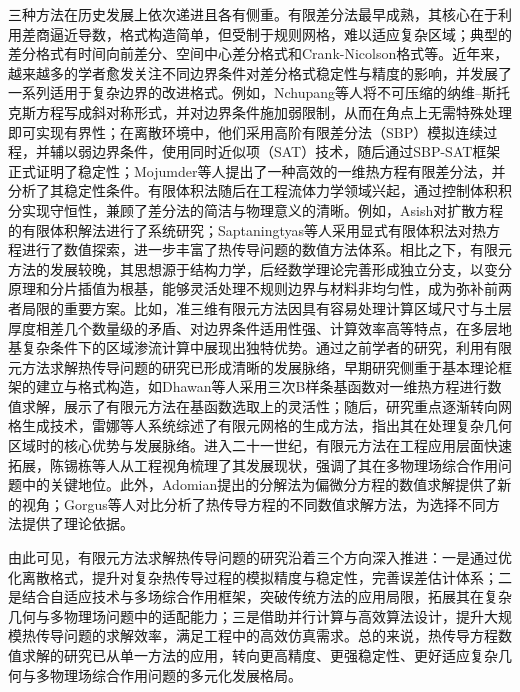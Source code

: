 \documentclass{GZUbachelorthesis}
\theoremstyle{chineseplain}
\begin{document}
三种方法在历史发展上依次递进且各有侧重。有限差分法最早成熟，其核心在于利用差商逼近导数，格式构造简单，但受制于规则网格，难以适应复杂区域；典型的差分格式有时间向前差分、空间中心差分格式和Crank-Nicolson格式等\cite{mojumder2023efficient}。近年来，越来越多的学者愈发关注不同边界条件对差分格式稳定性与精度的影响，并发展了一系列适用于复杂边界的改进格式。例如，Nchupang等人将不可压缩的纳维–斯托克斯方程写成斜对称形式，并对边界条件施加弱限制，从而在角点上无需特殊处理即可实现有界性；在离散环境中，他们采用高阶有限差分法（SBP）模拟连续过程，并辅以弱边界条件，使用同时近似项（SAT）技术，随后通过SBP-SAT框架正式证明了稳定性\cite{Nchupang2025}；Mojumder等人提出了一种高效的一维热方程有限差分法，并分析了其稳定性条件\cite{mojumder2023efficient}。有限体积法随后在工程流体力学领域兴起，通过控制体积积分实现守恒性，兼顾了差分法的简洁与物理意义的清晰。例如，Asish对扩散方程的有限体积解法进行了系统研究\cite{asish2016finite}；Saptaningtyas等人采用显式有限体积法对热方程进行了数值探索，进一步丰富了热传导问题的数值方法体系\cite{saptaningtyas2018finite}。相比之下，有限元方法的发展较晚，其思想源于结构力学，后经数学理论完善形成独立分支，以变分原理和分片插值为根基，能够灵活处理不规则边界与材料非均匀性，成为弥补前两者局限的重要方案\cite{lei2024review,chen2010finite}。比如，准三维有限元方法因具有容易处理计算区域尺寸与土层厚度相差几个数量级的矛盾、对边界条件适用性强、计算效率高等特点，在多层地基复杂条件下的区域渗流计算中展现出独特优势\cite{mei2023quasi3D}。通过之前学者的研究，利用有限元方法求解热传导问题的研究已形成清晰的发展脉络，早期研究侧重于基本理论框架的建立与格式构造，如Dhawan等人采用三次B样条基函数对一维热方程进行数值求解，展示了有限元方法在基函数选取上的灵活性\cite{dhawan2009numerical}；随后，研究重点逐渐转向网格生成技术，雷娜等人系统综述了有限元网格的生成方法，指出其在处理复杂几何区域时的核心优势与发展脉络\cite{lei2024review}。进入二十一世纪，有限元方法在工程应用层面快速拓展，陈锡栋等人从工程视角梳理了其发展现状，强调了其在多物理场综合作用问题中的关键地位\cite{chen2010finite}。此外，Adomian提出的分解法为偏微分方程的数值求解提供了新的视角\cite{adomian1994solution, adomian1998review}；Gorgus等人对比分析了热传导方程的不同数值求解方法，为选择不同方法提供了理论依据\cite{gorguis2008heat}。

由此可见，有限元方法求解热传导问题的研究沿着三个方向深入推进：一是通过优化离散格式，提升对复杂热传导过程的模拟精度与稳定性，完善误差估计体系\cite{adomian1994solution}；二是结合自适应技术与多场综合作用框架，突破传统方法的应用局限，拓展其在复杂几何与多物理场问题中的适配能力\cite{lei2024review,chen2010finite}；三是借助并行计算与高效算法设计，提升大规模热传导问题的求解效率，满足工程中的高效仿真需求。总的来说，热传导方程数值求解的研究已从单一方法的应用，转向更高精度、更强稳定性、更好适应复杂几何与多物理场综合作用问题的多元化发展格局。
\end{document}
